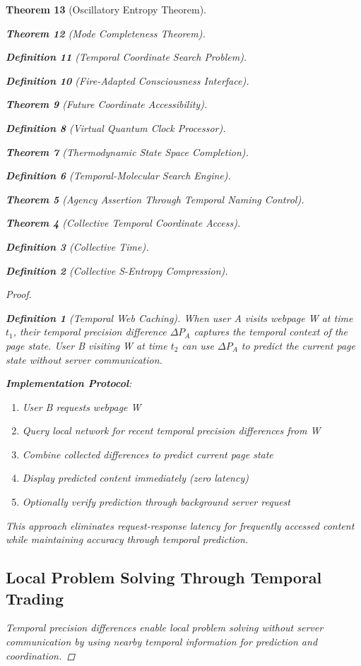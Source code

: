 \documentclass[12pt,a4paper]{article}
\newtheorem{theorem}{Theorem}[section]
\newtheorem{definition}[theorem]{Definition}
\begin{document}
\begin{theorem}[Oscillatory Entropy Theorem]
\begin{theorem}[Mode Completeness Theorem]
\begin{enumerate}
\begin{definition}[Temporal Coordinate Search Problem]
\begin{algorithm}
\begin{definition}[Fire-Adapted Consciousness Interface]
\begin{theorem}[Future Coordinate Accessibility]
\begin{definition}[Virtual Quantum Clock Processor]
\begin{itemize}
\begin{itemize}
\begin{theorem}[Thermodynamic State Space Completion]
\begin{definition}[Temporal-Molecular Search Engine]
\begin{theorem}[Agency Assertion Through Temporal Naming Control]
\begin{remark}
\begin{theorem}[Collective Temporal Coordinate Access]
\begin{definition}[Collective Time]
\begin{definition}[Collective S-Entropy Compression]
\begin{proof}
\begin{definition}[Temporal Web Caching]
When user A visits webpage W at time $t_1$, their temporal precision difference $\Delta P_A$ captures the temporal context of the page state. User B visiting W at time $t_2$ can use $\Delta P_A$ to predict the current page state without server communication.
\end{definition}

\textbf{Implementation Protocol}:
\begin{enumerate}
\item User B requests webpage W
\item Query local network for recent temporal precision differences from W
\item Combine collected differences to predict current page state
\item Display predicted content immediately (zero latency)
\item Optionally verify prediction through background server request
\end{enumerate}

This approach eliminates request-response latency for frequently accessed content while maintaining accuracy through temporal prediction.

\subsection{Local Problem Solving Through Temporal Trading}

Temporal precision differences enable local problem solving without server communication by using nearby temporal information for prediction and coordination.


\end{proof}
\end{definition}
\end{definition}
\end{theorem}
\end{remark}
\end{theorem}
\end{definition}
\end{theorem}
\end{itemize}
\end{itemize}
\end{definition}
\end{theorem}
\end{definition}
\end{algorithm}
\end{definition}
\end{enumerate}
\end{theorem}
\end{theorem}
\end{document}
